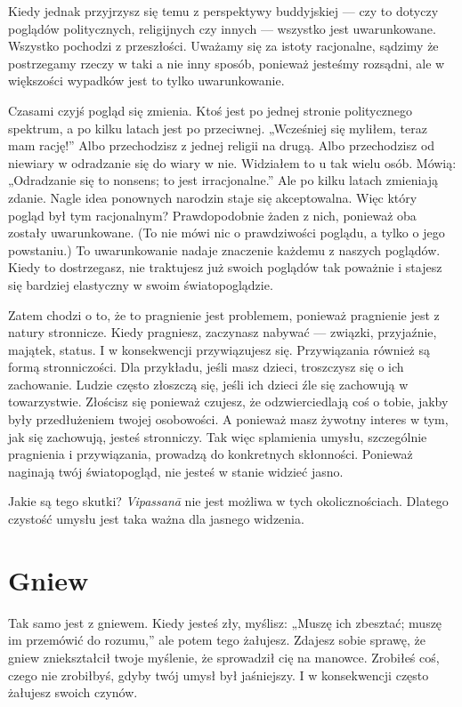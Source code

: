 \documentclass[12pt,openany]{book}
\begin{document}
Kiedy jednak przyjrzysz się temu z perspektywy buddyjskiej --- czy to dotyczy poglądów politycznych, religijnych czy innych --- wszystko jest uwarunkowane. Wszystko pochodzi z przeszłości. Uważamy się za istoty racjonalne, sądzimy że postrzegamy rzeczy w taki a nie inny sposób, ponieważ jesteśmy rozsądni, ale w większości wypadków jest to tylko uwarunkowanie.

Czasami czyjś pogląd się zmienia. Ktoś jest po jednej stronie politycznego spektrum, a po kilku latach jest po przeciwnej. \linebreak „Wcześniej się myliłem, teraz mam rację!” Albo przechodzisz z jednej religii na drugą. Albo przechodzisz od niewiary w odradzanie się do wiary w nie. Widziałem to u tak wielu osób. Mówią: „Odradzanie się to nonsens; to jest irracjonalne.” Ale po kilku latach zmieniają zdanie. Nagle idea ponownych narodzin staje się akceptowalna. Więc który pogląd był tym racjonalnym? Prawdopodobnie żaden z nich, ponieważ oba zostały uwarunkowane. (To nie mówi nic o prawdziwości poglądu, a tylko o jego powstaniu.) To uwarunkowanie nadaje znaczenie każdemu z naszych poglądów. Kiedy to dostrzegasz, nie traktujesz już swoich poglądów tak poważnie i stajesz się bardziej elastyczny w swoim światopoglądzie.

Zatem chodzi o to, że to pragnienie jest problemem, ponieważ pragnienie jest z natury stronnicze. Kiedy pragniesz, zaczynasz nabywać --- związki, przyjaźnie, majątek, status. I w konsekwencji przywiązujesz się. Przywiązania również są formą stronniczości. Dla przykładu, jeśli masz dzieci, troszczysz się o ich zachowanie. Ludzie często złoszczą się, jeśli ich dzieci źle się zachowują w towarzystwie. Złościsz się ponieważ czujesz, że odzwierciedlają coś o tobie, jakby były przedłużeniem twojej osobowości. A ponieważ masz żywotny interes w tym, jak się zachowują, jesteś stronniczy. Tak więc splamienia umysłu, szczególnie pragnienia i przywiązania, prowadzą do konkretnych skłonności. Ponieważ naginają twój światopogląd, nie jesteś w stanie widzieć jasno.

Jakie są tego skutki? \textit{Vipassanā} nie jest możliwa w tych okolicznościach. Dlatego czystość umysłu jest taka ważna dla jasnego widzenia.

\section*{Gniew}

Tak samo jest z gniewem. Kiedy jesteś zły, myślisz: „Muszę ich zbesztać; muszę im przemówić do rozumu,” ale potem tego żałujesz. Zdajesz sobie sprawę, że gniew zniekształcił twoje myślenie, że sprowadził cię na manowce. Zrobiłeś coś, czego nie zrobiłbyś, gdyby twój umysł był jaśniejszy. I w konsekwencji często żałujesz swoich czynów.
\end{document}
